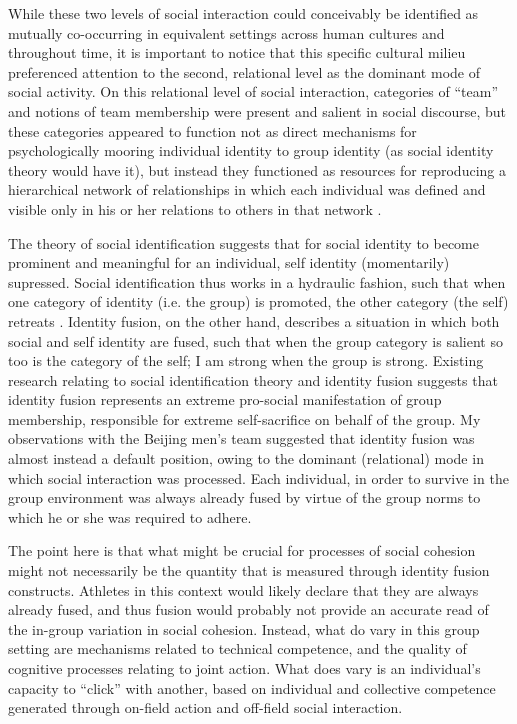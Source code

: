   While these two levels of social interaction could conceivably be identified as mutually co-occurring in equivalent settings across human cultures and throughout time, it is important to notice that this specific cultural milieu preferenced attention to the second, relational level as the dominant mode of social activity.  On this relational level of social interaction, categories of ``team'' and notions of team membership were present and salient in social discourse, but these categories appeared to function not as direct mechanisms for psychologically mooring individual identity to group identity (as social identity theory would have it), but instead they functioned as resources for reproducing a hierarchical network of relationships in which each individual was defined and visible only in his or her relations to others in that network \cite{Yuki2003}.

  The theory of social identification suggests that for social identity to become prominent and meaningful for an individual, self identity (momentarily) supressed.  Social identification thus works in a hydraulic fashion, such that when one category of identity (i.e. the group) is promoted, the other category (the self) retreats \citep{Swann2009}.  Identity fusion, on the other hand, describes a situation in which both social and self identity are fused, such that when the group category is salient so too is the category of the self; I am strong when the group is strong.  Existing research relating to social identification theory and identity fusion suggests that identity fusion represents an extreme pro-social manifestation of group membership, responsible for extreme self-sacrifice on behalf of the group.  My observations with the Beijing men's team suggested that identity fusion was almost instead a default position, owing to the dominant (relational) mode in which social interaction was processed.  Each individual, in order to survive in the group environment was always already fused by virtue of the group norms to which he or she was required to adhere.

  The point here is that what might be crucial for processes of social cohesion might not necessarily be the quantity that is measured through identity fusion constructs. Athletes in this context would likely declare that they are always already fused, and thus fusion would probably not provide an accurate read of the in-group variation in social cohesion. Instead, what do vary in this group setting are mechanisms related to technical competence, and the quality of cognitive processes relating to joint action.  What does vary is an individual's capacity to ``click'' with another, based on individual and collective competence generated through on-field action and off-field social interaction.

